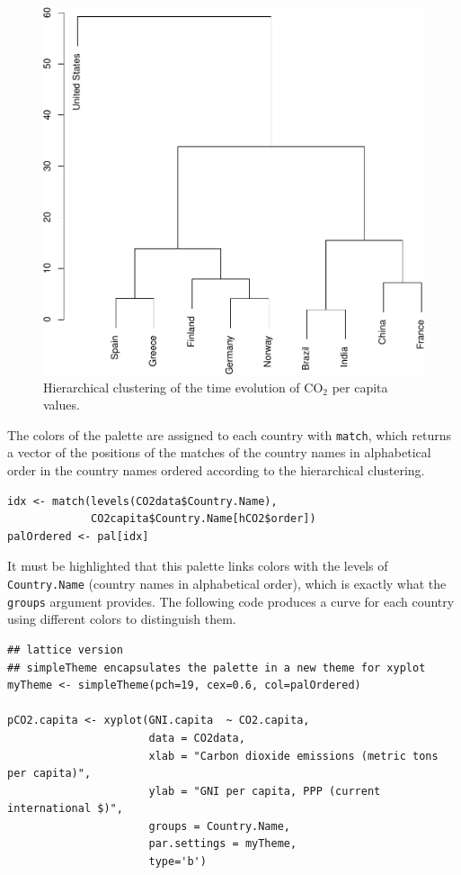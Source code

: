\begin{figure}[htbp]
\centering
\includegraphics[width=.9\linewidth]{figs/hclust.pdf}
\caption{Hierarchical clustering of the time evolution of \(\mathrm{CO_2}\) per capita values. \label{fig:hclustCO2}}
\end{figure}


The colors of the palette are assigned to each country with \texttt{match},
which returns a vector of the positions of the matches of the country
names in alphabetical order in the country names ordered according to
the hierarchical clustering.
\lstset{language=r,label= ,caption= ,captionpos=b,numbers=none}
\begin{lstlisting}
idx <- match(levels(CO2data$Country.Name), 
             CO2capita$Country.Name[hCO2$order])
palOrdered <- pal[idx]  
\end{lstlisting}
It must be highlighted that this palette links colors with the levels
of \texttt{Country.Name} (country names in alphabetical order), which is
exactly what the \texttt{groups} argument provides. The following code
produces a curve for each country using different colors to
distinguish them.

\lstset{language=r,label= ,caption= ,captionpos=b,numbers=none}
\begin{lstlisting}
## lattice version
## simpleTheme encapsulates the palette in a new theme for xyplot
myTheme <- simpleTheme(pch=19, cex=0.6, col=palOrdered)

pCO2.capita <- xyplot(GNI.capita  ~ CO2.capita,
                      data = CO2data,
                      xlab = "Carbon dioxide emissions (metric tons per capita)",
                      ylab = "GNI per capita, PPP (current international $)",
                      groups = Country.Name,
                      par.settings = myTheme,
                      type='b')
\end{lstlisting}

